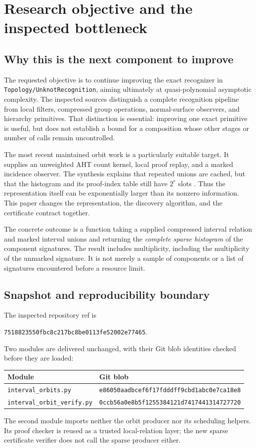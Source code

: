 \documentclass[11pt,letterpaper]{article}
\newcommand{\code}[1]{\nolinkurl{#1}}
\begin{document}
\section{Research objective and the inspected bottleneck}
\label{sec:scope}

\subsection{Why this is the next component to improve}
The requested objective is to continue improving the exact recognizer in
\code{Topology/UnknotRecognition}, aiming ultimately at quasi-polynomial
asymptotic complexity. The inspected sources distinguish a complete recognition
pipeline from local filters, compressed group operations, normal-surface
observers, and hierarchy primitives. That distinction is essential: improving
one exact primitive is useful, but does not establish a bound for a composition
whose other stages or number of calls remain uncontrolled.

The most recent maintained orbit work is a particularly suitable target.
It supplies an unweighted AHT count kernel, local proof replay, and a marked
incidence observer. The synthesis explains that repeated unions are cached,
but that the histogram and its proof-index table still have $2^r$ slots
\cite{upstream,orbitreport}. Thus the representation itself can be exponentially
larger than its nonzero information. This paper changes the representation,
the discovery algorithm, and the certificate contract together.

The concrete outcome is a function taking a supplied compressed interval
relation and marked interval unions and returning the \emph{complete sparse
histogram} of the component signatures. The result includes multiplicity,
including the multiplicity of the unmarked signature. It is not merely a
sample of components or a list of signatures encountered before a resource
limit.

\subsection{Snapshot and reproducibility boundary}
The inspected repository ref is
\begin{center}
\small\code{7518823550fbc8c217bc8be0113fe52002e77465}.
\end{center}
Two modules are delivered unchanged, with their Git blob identities checked
before they are loaded:
\begin{center}
\small
\begin{tabular}{@{}ll@{}}
\toprule
Module & Git blob\\
\midrule
\code{interval_orbits.py} & \code{e86050aadbcef6f17fdddff9cbd1abc0e7ca18e8}\\
\code{interval_orbit_verify.py} & \code{0ccb56a0e8b5f1255384121d7417441314727720}\\
\bottomrule
\end{tabular}
\end{center}
The second module imports neither the orbit producer nor its scheduling
helpers. Its proof checker is reused as a trusted local-relation layer; the
new sparse certificate verifier does not call the sparse producer either.
\end{document}
